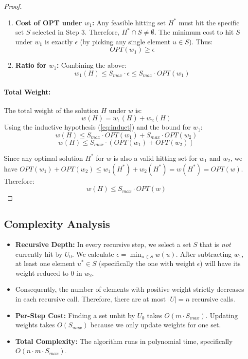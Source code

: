 \begin{proof}
\begin{enumerate}
    \item \textbf{Cost of OPT under $w_1$:}
    Any feasible hitting set $H^*$ must hit the specific set $S$ selected in Step 3. Therefore, $H^* \cap S \neq \emptyset$. The minimum cost to hit $S$ under $w_1$ is exactly $\epsilon$ (by picking any single element $u \in S$). Thus:
    \[ OPT(w_1) \ge \epsilon \]
    
    \item \textbf{Ratio for $w_1$:} Combining the above:
    \[ w_1(H) \le S_{max} \cdot \epsilon \le S_{max} \cdot OPT(w_1) \]
\end{enumerate}

\paragraph{Total Weight:}
The total weight of the solution $H$ under $w$ is:
\[ w(H) = w_1(H) + w_2(H) \]
Using the inductive hypothesis (\ref{eq:induct}) and the bound for $w_1$:
\[ w(H) \le S_{max} \cdot OPT(w_1) + S_{max} \cdot OPT(w_2) \]
\[ w(H) \le S_{max} \cdot (OPT(w_1) + OPT(w_2)) \]

Since any optimal solution $H^*$ for $w$ is also a valid hitting set for $w_1$ and $w_2$, we have $OPT(w_1) + OPT(w_2) \le w_1(H^*) + w_2(H^*) = w(H^*) = OPT(w)$. Therefore:
\[ w(H) \le S_{max} \cdot OPT(w) \]
\end{proof}

\subsection*{Complexity Analysis}

\begin{itemize}
    \item \textbf{Recursive Depth:} In every recursive step, we select a set $S$ that is \textit{not} currently hit by $U_0$. We calculate $\epsilon = \min_{u \in S} w(u)$. After subtracting $w_1$, at least one element $u^* \in S$ (specifically the one with weight $\epsilon$) will have its weight reduced to 0 in $w_2$.
    \item Consequently, the number of elements with positive weight strictly decreases in each recursive call. Therefore, there are at most $|U| = n$ recursive calls.
    \item \textbf{Per-Step Cost:} Finding a set unhit by $U_0$ takes $O(m \cdot S_{max})$. Updating weights takes $O(S_{max})$ because we only update weights for one set.
    \item \textbf{Total Complexity:} The algorithm runs in polynomial time, specifically $O(n \cdot m \cdot S_{max})$.
\end{itemize}
